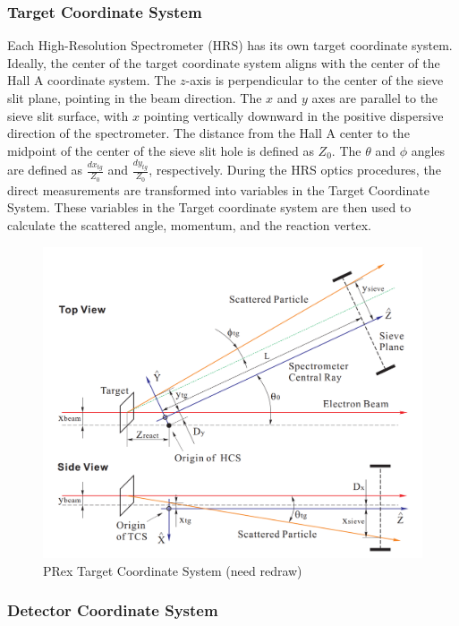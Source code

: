 \subsubsection{Target Coordinate System}

Each High-Resolution Spectrometer (HRS) has its own target coordinate system. Ideally, the center of the target coordinate system aligns with the center of the Hall A coordinate system. The $z$-axis is perpendicular to the center of the sieve slit plane, pointing in the beam direction. The $x$ and $y$ axes are   parallel to the sieve slit surface, with $x$ pointing vertically downward in the positive dispersive direction of the spectrometer. The distance from the Hall A center to the midpoint of the center of the sieve slit hole is defined as $Z_0$. The $\theta$ and $\phi$ angles are defined as $\frac{dx_{tg}}{Z_0}$ and $\frac{dy_{tg}}{Z_0}$, respectively. During the HRS optics procedures, the direct measurements are transformed into variables in the Target Coordinate System. These variables in the Target coordinate system are then used to calculate the scattered angle, momentum, and the reaction vertex.

\begin{figure}[!h]
    \centering
    \includegraphics[width=\textwidth]{images/chap4/target_coordinate_system.png}
    \caption{PRex Target Coordinate System  (need redraw)}
    \label{fig:target_coordinate_system}
\end{figure}


\subsubsection{Detector Coordinate System}

